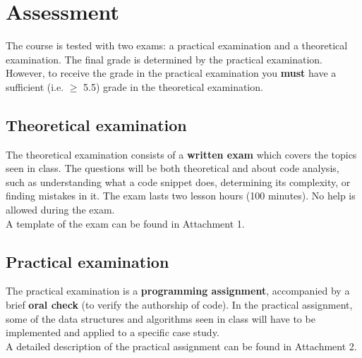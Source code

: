 \section{Assessment}
	The course is tested with two exams: a practical examination and a theoretical examination. The final grade is determined by the practical examination. However, to receive the grade in the practical examination you \textbf{must} have a sufficient (i.e. $\geq$ 5.5) grade in the theoretical examination.

	\subsection{Theoretical examination}
		The theoretical examination consists of a \textbf{written exam} which covers the topics seen in class. The questions will be both theoretical and about code analysis, such as understanding what a code snippet does, determining its complexity, or finding mistakes in it.
		The exam lasts two lesson hours (100 minutes). No help is allowed during the exam.\\
		A template of the exam can be found in Attachment 1.

	\subsection{Practical examination}
	The practical examination is a \textbf{programming assignment}, accompanied by a brief \textbf{oral check} (to verify the authorship of code). In the practical assignment, some of the data structures and algorithms seen in class will have to be implemented and applied to a specific case study.\\ 
	A detailed description of the practical assignment can be found in Attachment 2.
	
